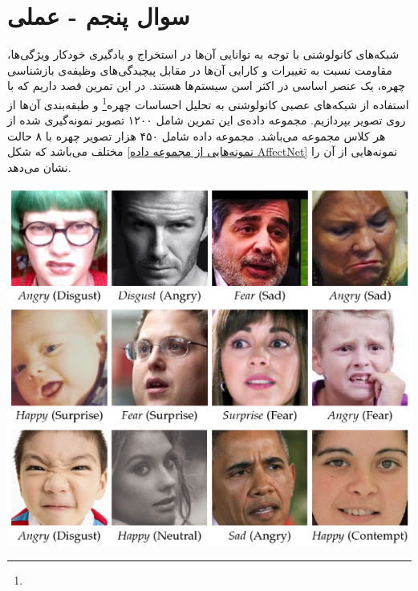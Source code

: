 \section{سوال پنجم - عملی}
شبکه‌های کانولوشنی با توجه به توانایی آن‌ها در استخراج و یادگیری خودکار ویژگی‌ها، مقاومت نسبت به تغییرات و کارایی آن‌ها در مقابل پیچیدگی‌های وظیفه‌ی بازشناسی چهره، یک عنصر اساسی در اکثر اسن سیستم‌ها هستند. در این تمرین قصد داریم که با استفاده از شبکه‌های عصبی کانولوشنی به تحلیل احساسات چهره\footnote{} و طبقه‌بندی آن‌ها از روی تصویر بپردازیم. مجموعه داده‌ی این تمرین شامل ۱۲۰۰ تصویر نمونه‌گیری شده از هر کلاس مجموعه  می‌باشد. مجموعه داده  شامل ۴۵۰ هزار تصویر چهره با ۸ حالت مختلف می‌باشد که شکل \ref{نمونه‌هایی از مجموعه داده AffectNet} نمونه‌هایی از آن را نشان می‌دهد.



\begin{center}
	\includegraphics*[width=0.6\linewidth]{pics/img2.png}
	\label{نمونه‌هایی از مجموعه داده AffectNet}
\end{center}



